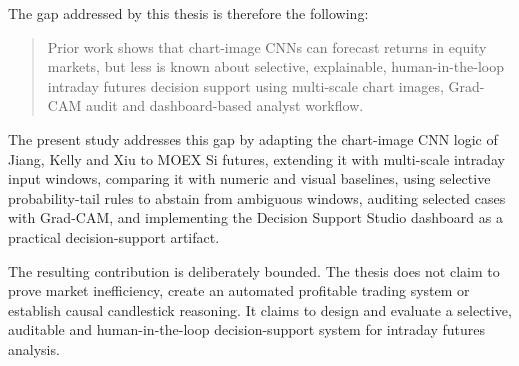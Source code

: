 The gap addressed by this thesis is therefore the following:

\begin{quote}
Prior work shows that chart-image CNNs can forecast returns in equity markets, but less is known about selective, explainable, human-in-the-loop intraday futures decision support using multi-scale chart images, Grad-CAM audit and dashboard-based analyst workflow.
\end{quote}

The present study addresses this gap by adapting the chart-image CNN logic of Jiang, Kelly and Xiu to MOEX Si futures, extending it with multi-scale intraday input windows, comparing it with numeric and visual baselines, using selective probability-tail rules to abstain from ambiguous windows, auditing selected cases with Grad-CAM, and implementing the Decision Support Studio dashboard as a practical decision-support artifact.

The resulting contribution is deliberately bounded. The thesis does not claim to prove market inefficiency, create an automated profitable trading system or establish causal candlestick reasoning. It claims to design and evaluate a selective, auditable and human-in-the-loop decision-support system for intraday futures analysis.

